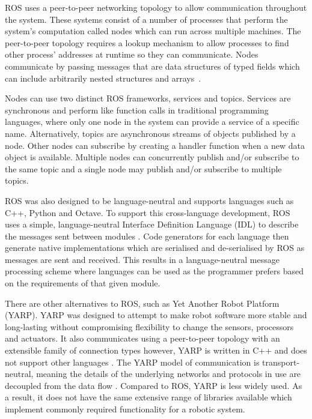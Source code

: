 ROS uses a peer-to-peer networking topology to allow communication
throughout the system. These systems consist of a number of processes
that perform the system's computation called nodes which can
run across multiple machines. The peer-to-peer topology requires
a lookup mechanism to allow processes to find other process' addresses at
runtime so they can communicate. Nodes communicate by passing messages
that are data structures of typed fields which can include arbitrarily nested
structures and arrays~\cite{crick2017rosbridge}.


Nodes can use two distinct ROS frameworks, services and topics.
Services are synchronous and perform like function
calls in traditional programming languages, where only one node in the
system can provide a service of a specific name. Alternatively, topics are
asynchronous streams of objects published by a node. Other nodes can
subscribe by creating a handler function when a new data object is available.
Multiple nodes can concurrently publish and/or subscribe to the same topic and
a single node may publish and/or subscribe to multiple topics.

ROS was also designed to be language-neutral and supports languages
such as C++, Python and Octave. To support this cross-language
development, ROS uses a simple, language-neutral Interface Definition
Language (IDL) to describe the messages sent between modules
\cite{quigley2009ros}. Code generators for each language then generate
native implementations which are serialised and de-serialised by ROS
as messages are sent and received. This results in a language-neutral
message processing scheme where languages can be used as the programmer
prefers based on the requirements of that given module.

There are other alternatives to ROS, such as Yet Another Robot Platform
(YARP). YARP was designed to attempt to make robot software more stable
and long-lasting without compromising flexibility to change the sensors,
processors and actuators. It also communicates using a peer-to-peer
topology with an extensible family of connection types however, YARP is
written in C++ and does not support other languages \cite{aboutYARP}.
The YARP model of communication is transport-neutral, meaning the details
of the underlying networks and protocols in use are decoupled from the
data flow \cite{exactlyIsYARP}. Compared to ROS, YARP is less widely used.
As a result, it does not have the same extensive range of libraries available
which implement commonly required functionality for a robotic system.


